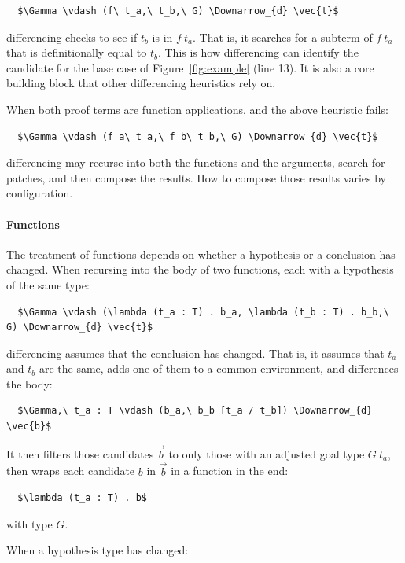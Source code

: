\begin{lstlisting}
  $\Gamma \vdash (f\ t_a,\ t_b,\ G) \Downarrow_{d} \vec{t}$
\end{lstlisting}
differencing checks to see if $t_b$ is in $f\ t_a$.
That is, it searches for a subterm of $f\ t_a$ that is definitionally equal to $t_b$.
This is how differencing can identify the candidate for the base case of Figure~\ref{fig:example} (line 13).
It is also a core building block that other differencing heuristics rely on.

When both proof terms are function applications, and the above heuristic fails:

\begin{lstlisting}
  $\Gamma \vdash (f_a\ t_a,\ f_b\ t_b,\ G) \Downarrow_{d} \vec{t}$
\end{lstlisting}
differencing may recurse into both the functions and the arguments, search for patches, and then compose the results.
How to compose those results varies by configuration.

\paragraph{Functions} %
The treatment of functions depends on whether a hypothesis or a conclusion has changed.
When recursing into the body of two functions, each with a hypothesis of the same type:

\begin{lstlisting}
  $\Gamma \vdash (\lambda (t_a : T) . b_a, \lambda (t_b : T) . b_b,\ G) \Downarrow_{d} \vec{t}$
\end{lstlisting}
differencing assumes that the conclusion has changed.
That is, it assumes that $t_a$ and $t_b$ are the same, adds one of them to a common environment,
and differences the body:

\begin{lstlisting}
  $\Gamma,\ t_a : T \vdash (b_a,\ b_b [t_a / t_b]) \Downarrow_{d} \vec{b}$
\end{lstlisting}
It then filters those candidates $\vec{b}$ to only those with an adjusted goal type $G\ t_a$,
then wraps each candidate $b$ in $\vec{b}$ in a function in the end:

\begin{lstlisting}
  $\lambda (t_a : T) . b$
\end{lstlisting}
with type $G$.

When a hypothesis type has changed:

